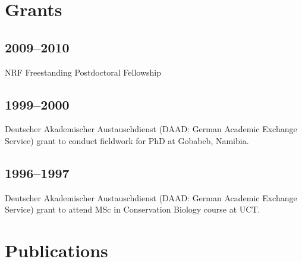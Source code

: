 \documentclass[a4paper]{article}
\begin{document}
    

    







\section{Grants}

\subsection{2009--2010}

NRF Freestanding Postdoctoral Fellowship

\subsection{1999--2000}

Deutscher Akademischer Austauschdienst (DAAD: German Academic Exchange
	Service) grant to conduct fieldwork for PhD at Gobabeb, Namibia.

\subsection{1996--1997}

Deutscher Akademischer Austauschdienst (DAAD: German Academic Exchange
	Service) grant to attend MSc in Conservation Biology course at UCT.
	
\section{Publications}
\end{document}
